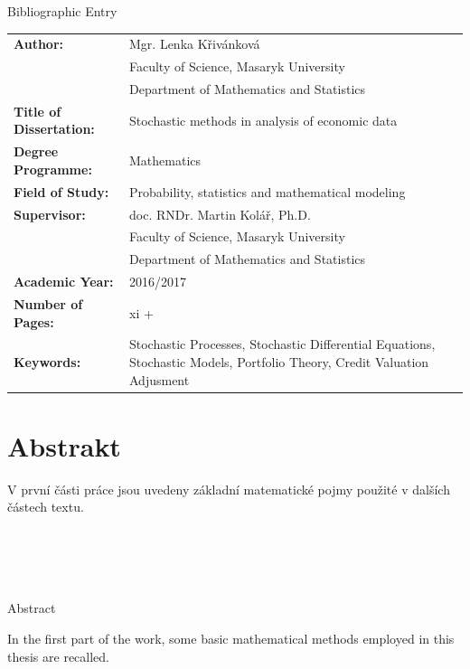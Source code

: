 \documentclass[a4paper,12pt]{report}
\theoremstyle{definition} \newtheorem{definice}[veta]{Definice}
\theoremstyle{remark}
\begin{document}
\begin{flushright} {{\Huge Bibliographic Entry}} \vspace{38pt} \end{flushright}

\hspace{-0.7cm}
\begin{tabular}{p{4.5cm}  p{8.5cm}}
\textbf{Author:} & Mgr. Lenka Křivánková \\
& Faculty of Science, Masaryk University \\
& Department of Mathematics and Statistics \\
\textbf{Title of Dissertation:} & Stochastic methods in analysis of economic data \\
\textbf{Degree Programme:} & Mathematics \\
\textbf{Field of Study:} & Probability, statistics and mathematical modeling \\
\textbf{Supervisor:} & doc. RNDr. Martin Kolář, Ph.D.  \\
& Faculty of Science, Masaryk University \\
& Department of Mathematics and Statistics \\
\textbf{Academic Year:} &2016/2017 \\
\textbf{Number of Pages:} & xi + \pageref*{LastPage} \\
\textbf{Keywords:} & Stochastic Processes, Stochastic Differential Equations, Stochastic Models, Portfolio Theory, Credit Valuation Adjusment\\
\end{tabular}

\chapter*{Abstrakt}
\thispagestyle{empty}
V první části práce jsou uvedeny základní matematické pojmy použité v dalších částech textu. 
\\\\\\\\\\

\begin{flushright} {{\Huge Abstract}} \vspace{38pt} \end{flushright}
In the first part of the work, some basic mathematical methods employed in this thesis are recalled. 
\end{document}
